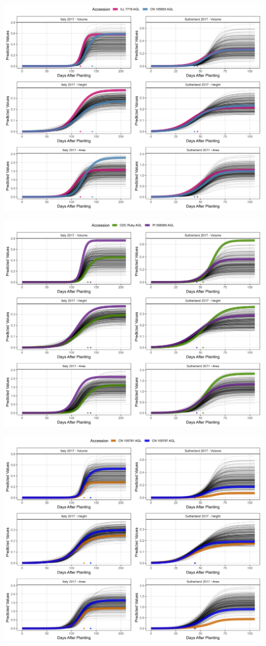 \documentclass[
]{article}
\begin{document}
\includegraphics{Additional/Additional_Figure_03_3.png}

\includegraphics{Additional/Additional_Figure_03_4.png}

\includegraphics{Additional/Additional_Figure_03_5.png}
\end{document}
